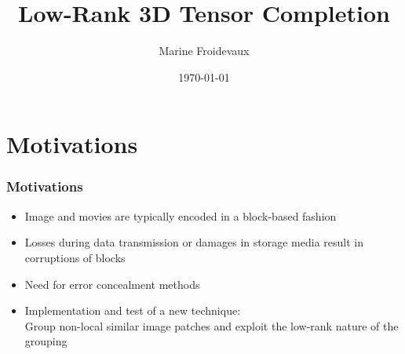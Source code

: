 \documentclass{beamer}
\title[Low-Rank Tensor Completion]{Low-Rank 3D Tensor Completion} %
\author{Marine Froidevaux} %
\institute[EPFL] %
{
\'Ecole Polytechnique F\'ed\'erale de Lausanne \\ %
\medskip
\textit{marine.froidevaux@epfl.ch} %
}
\date{\today} %
\begin{document}
\begin{frame}
\titlepage %
\end{frame}



\section{Motivations} %


\begin{frame}
\frametitle{Motivations}
\begin{itemize}
\item Image and movies are typically encoded in a block-based fashion
\item Losses during data transmission or damages in storage media result in corruptions of blocks
\item Need for error concealment methods
\item Implementation and test of a new technique:\\Group non-local similar image patches and exploit the low-rank nature of the grouping
\end{itemize}
\end{frame}
\end{document}
